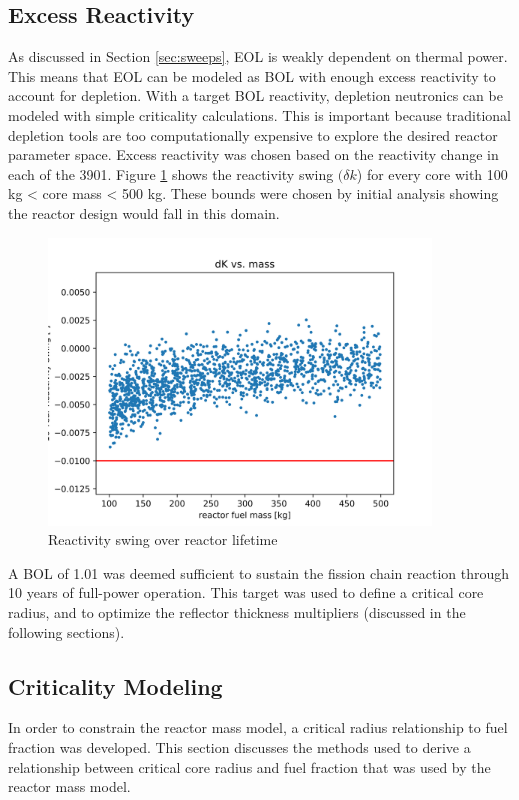 \subsection{Excess Reactivity}
As discussed in Section \ref{sec:sweeps}, EOL \keff is weakly dependent on
thermal power. This means that EOL \keff can be modeled as BOL \keff with enough
excess reactivity to account for depletion. With a target BOL reactivity,
depletion neutronics can be modeled with simple criticality calculations. This
is important because traditional depletion tools are too computationally
expensive to explore the desired reactor parameter space. Excess reactivity was
chosen based on the reactivity change in each of the 3901. Figure
\ref{fig:delta_k_eol} shows the reactivity swing $(\delta k$) for every core
with 100 kg < core mass < 500 kg. These bounds were chosen by initial analysis
showing the reactor design would fall in this domain.

\begin{figure}[h]
    \centering
    \includegraphics[width=4in]{../images/dK_vs_mass.png}
\caption{Reactivity swing over reactor lifetime}
\label{fig:delta_k_eol}
\end{figure}

A BOL \keff of 1.01 was deemed sufficient to sustain the fission chain reaction
through 10 years of full-power operation. This \keff target was used to define a
critical core radius, and to optimize the reflector thickness multipliers
(discussed in the following sections).

\subsection{Criticality Modeling}\label{sec:crit_model}
In order to constrain the reactor mass model, a critical radius relationship to
fuel fraction was developed. This section discusses the methods used to derive a
relationship between critical core radius and fuel fraction that was used by the
reactor mass model.

